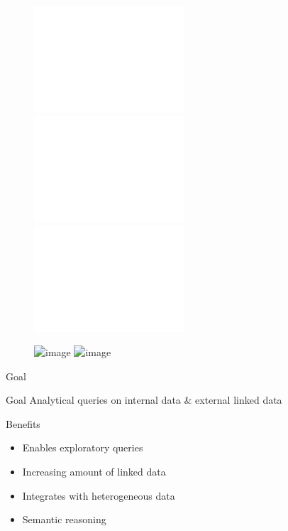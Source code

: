 \section{\intro}
\begin{frame}{\intro}
\begin{figure}
    \includegraphics<+>[trim=0 680 225 0,clip,width=0.5\textwidth]{images/motivation_top-00.pdf}
    \includegraphics<+>[trim=0 680 225 0,clip,width=0.5\textwidth]{images/motivation_top-01.pdf}
    \includegraphics<+->[trim=0 680 225 0,clip,width=0.5\textwidth]{images/motivation_top-1.pdf}
\end{figure}
\begin{figure}
    \includegraphics<5>[trim=0 500 200 0,clip,width=0.5\textwidth]{images/motivation_left-2}
    \includegraphics<6>[trim=0 500 200 0,clip,width=0.5\textwidth]{images/motivation_left-3}
\end{figure}

\end{frame}


\begin{frame}{Goal}
\begin{block}{Goal}
Analytical queries on internal data \& external linked data
\end{block}
\pause
\begin{block}{Benefits}
\begin{itemize}
    \item Enables exploratory queries
    \item Increasing amount of linked data
    \item Integrates with heterogeneous data
    \item Semantic reasoning
\end{itemize}
\end{block}
\end{frame}

